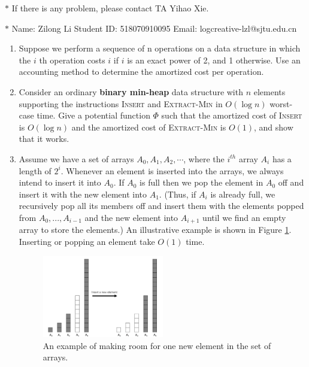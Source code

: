 \documentclass[12pt,a4paper]{article}
\theoremstyle{definition}
\begin{document}
\noindent

\noindent{}
\begin{center}
\footnotesize{\color{red}$*$ If there is any problem, please contact TA Yihao Xie. }

\footnotesize{\color{blue}$*$ Name: Zilong Li  \quad Student ID: 518070910095 \quad Email: logcreative-lzl@sjtu.edu.cn}
\end{center}
\begin{enumerate}
	\item Suppose we perform a sequence of n operations on a data structure in which the $i$ th 		operation costs $i$ if $i$ is an exact power of 2, and 1 otherwise. Use an accounting method to determine the amortized cost per operation.

	\item Consider an ordinary \textbf{binary min-heap} data structure with $n$ elements supporting
the instructions \textsc{Insert} and \textsc{Extract-Min} in $O(\log n)$ worst-case time. Give a
potential function $\Phi$ such that the amortized cost of \textsc{Insert} is $O(\log n)$ and the
amortized cost of \textsc{Extract-Min} is $O(1)$, and show that it works.
	
	\item Assume we have a set of arrays $A_0, A_1, A_2,\cdots$, where the $i^{th}$ array $A_i$ has a length of $2^i$. Whenever an element is inserted into the arrays, we always intend to insert it into $A_0$. If $A_0$ is full then we pop the element in $A_0$ off and insert it with the new element into $A_{1}$. (Thus, if $A_{i}$ is already full, we recursively pop all its members off and insert them with the elements popped from $A_0,...,A_{i-1}$ and the new element into $A_{i+1}$ until we find an empty array to store the elements.) An illustrative example is shown in Figure \ref{Fig-MultiArray}. Inserting or popping an element take $O(1)$ time.

	\begin{figure}[!htbp]
	\centering
	\includegraphics[width=0.5\textwidth]{Fig-MultiArray.pdf}
	\caption{An example of making room for one new element in the set of arrays.}
	\label{Fig-MultiArray}
	\end{figure}


\end{enumerate}
\end{document}
